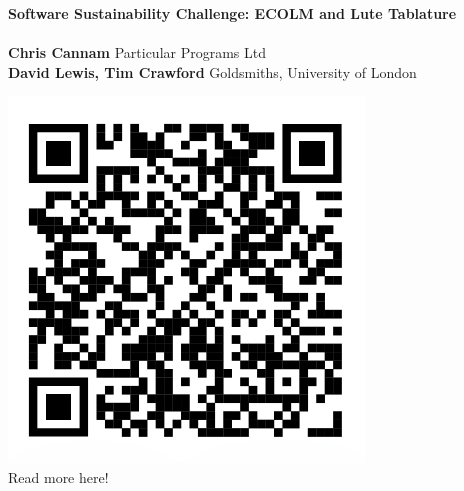 \documentclass[a0,landscape]{a0poster}
\begin{document}
\begin{minipage}[b]{0.9\linewidth}
\veryHuge \textbf{Software Sustainability Challenge: ECOLM and Lute Tablature}\\
\\[1cm]
\huge \textbf{Chris Cannam} Particular Programs Ltd\\
\textbf{David Lewis, Tim Crawford} Goldsmiths, University of London\\
\end{minipage}
%
\begin{minipage}[b]{0.1\linewidth}
  \begin{center}
    \includegraphics[]{images/qr}\\
    \vspace{-5mm}
  Read more here!
  \end{center}
\end{minipage}

\vspace{1cm} %

\end{document}
